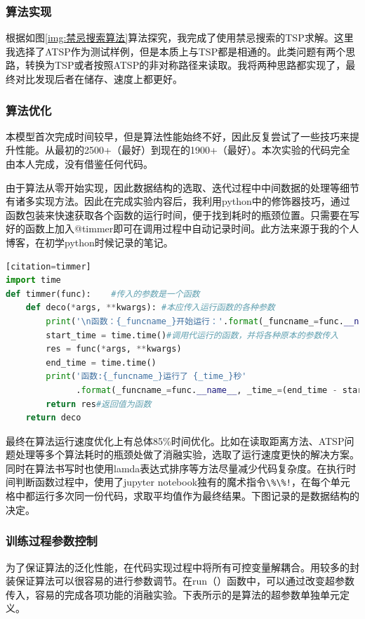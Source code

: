 \documentclass[lang=cn,11pt]{elegantpaper}
\begin{document}
\subsubsection{算法实现}
根据如图\ref{img:禁忌搜索算法}算法探究，我完成了使用禁忌搜索的TSP求解。这里我选择了ATSP作为测试样例，但是本质上与TSP都是相通的。此类问题有两个思路，转换为TSP或者按照ATSP的非对称路径来读取。我将两种思路都实现了，最终对比发现后者在储存、速度上都更好。

\subsubsection{算法优化}
本模型首次完成时间较早，但是算法性能始终不好，因此反复尝试了一些技巧来提升性能。从最初的2500+（最好）到现在的1900+（最好）。本次实验的代码完全由本人完成，没有借鉴任何代码。

由于算法从零开始实现，因此数据结构的选取、迭代过程中中间数据的处理等细节有诸多实现方法。因此在完成实验内容后，我利用python中的修饰器技巧，通过函数包装来快速获取各个函数的运行时间，便于找到耗时的瓶颈位置。只需要在写好的函数上加入@timmer即可在调用过程中自动记录时间。此方法来源于我的个人博客，在初学python时候记录的笔记。

\begin{lstlisting}[language=python][citation=timmer]
import time
def timmer(func):    #传入的参数是一个函数
    def deco(*args, **kwargs): #本应传入运行函数的各种参数
        print('\n函数：{_funcname_}开始运行：'.format(_funcname_=func.__name__))
        start_time = time.time()#调用代运行的函数，并将各种原本的参数传入
        res = func(*args, **kwargs)
        end_time = time.time()
        print('函数:{_funcname_}运行了 {_time_}秒'
              .format(_funcname_=func.__name__, _time_=(end_time - start_time)))
        return res#返回值为函数
    return deco
\end{lstlisting}

最终在算法运行速度优化上有总体85\%时间优化。比如在读取距离方法、ATSP问题处理等多个算法耗时的瓶颈处做了消融实验，选取了运行速度更快的解决方案。同时在算法书写时也使用lamda表达式排序等方法尽量减少代码复杂度。在执行时间判断函数过程中，使用了jupyter notebook独有的魔术指令\lstinline{\%\%!}，在每个单元格中都运行多次同一份代码，求取平均值作为最终结果。下图记录的是数据结构的决定。

\subsubsection{训练过程参数控制}
为了保证算法的泛化性能，在代码实现过程中将所有可控变量解耦合。用较多的封装保证算法可以很容易的进行参数调节。在run（）函数中，可以通过改变超参数传入，容易的完成各项功能的消融实验。下表所示的是算法的超参数单独单元定义。
\end{document}

